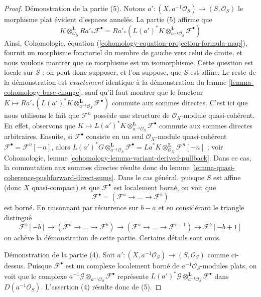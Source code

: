 \begin{proof}
\medskip\noindent
Démonstration de la partie (5). Notons
$a' : (X, a^{-1}\mathcal{O}_S) \to (S, \mathcal{O}_S)$
le morphisme plat évident d'espaces annelés. La partie (5) affirme que
$$
K \otimes_{\mathcal{O}_S}^\mathbf{L} Ra'_*\mathcal{F}^\bullet =
Ra'_*(L(a')^*K \otimes_{a^{-1}\mathcal{O}_S}^\mathbf{L}
\mathcal{F}^\bullet)
$$
Ainsi,
Cohomologie, équation (\ref{cohomology-equation-projection-formula-map}),
fournit un morphisme fonctoriel du membre de gauche vers celui de droite, et nous voulons
montrer que ce morphisme est un isomorphisme.
Cette question est locale sur $S$ ; on peut donc supposer, et l'on suppose, que $S$
est affine. Le reste de la démonstration est {\it exactement} identique à la
démonstration du lemme \ref{lemma-cohomology-base-change}, sauf qu'il faut
montrer que le foncteur
$K \mapsto Ra'_*(L(a')^*K \otimes_{a^{-1}\mathcal{O}_S}^\mathbf{L}
\mathcal{F}^\bullet)$ commute aux sommes directes.
C'est ici que nous utilisons le fait que $\mathcal{F}^n$ possède une structure
de $\mathcal{O}_X$-module quasi-cohérent. En effet, observons que
$K \mapsto L(a')^*K
\otimes_{a^{-1}\mathcal{O}_S}^\mathbf{L} \mathcal{F}^\bullet$
commute aux sommes directes arbitraires. Ensuite, si
$\mathcal{F}^\bullet$ consiste en un seul $\mathcal{O}_X$-module
quasi-cohérent $\mathcal{F}^\bullet = \mathcal{F}^n[-n]$,
alors $L(a')^*G
\otimes_{a^{-1}\mathcal{O}_S}^\mathbf{L} \mathcal{F}^\bullet =
La^*K \otimes_{\mathcal{O}_X}^\mathbf{L} \mathcal{F}^n[-n]$ ; voir
Cohomologie, lemme \ref{cohomology-lemma-variant-derived-pullback}.
Dans ce cas, la commutation aux sommes directes résulte donc du
lemme \ref{lemma-quasi-coherence-pushforward-direct-sums}.
Dans le cas général, puisque $S$ est affine (donc $X$ quasi-compact)
et que $\mathcal{F}^\bullet$ est localement borné, on voit que
$$
\mathcal{F}^\bullet = (\mathcal{F}^a \to \ldots \to \mathcal{F}^b)
$$
est borné. En raisonnant par récurrence sur $b - a$ et en considérant le
triangle distingué
$$
\mathcal{F}^b[-b] \to (\mathcal{F}^a \to \ldots \to \mathcal{F}^b)
\to (\mathcal{F}^a \to \ldots \to \mathcal{F}^{b - 1}) \to
\mathcal{F}^b[-b + 1]
$$
on achève la démonstration de cette partie. Certains détails sont omis.

\medskip\noindent
Démonstration de la partie (4). Soit $a' : (X, a^{-1}\mathcal{O}_S) \to (S, \mathcal{O}_S)$
comme ci-dessus. Puisque $\mathcal{F}^\bullet$ est un complexe localement borné
de $a^{-1}\mathcal{O}_S$-modules plats, on voit que le complexe
$a^{-1}\mathcal{G} \otimes_{a^{-1}\mathcal{O}_S} \mathcal{F}^\bullet$
représente $L(a')^*\mathcal{G}
\otimes_{a^{-1}\mathcal{O}_S}^\mathbf{L}
\mathcal{F}^\bullet$ dans $D(a^{-1}\mathcal{O}_S)$. L'assertion (4)
résulte donc de (5).
\end{proof}


